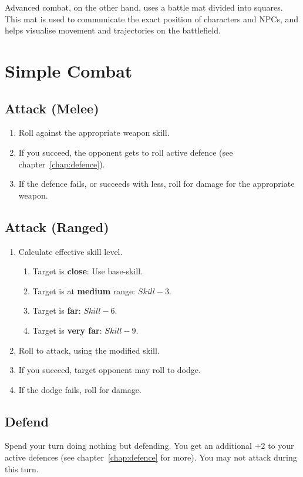 Advanced combat, on the other hand, uses a battle mat divided into squares. This mat is used to communicate the exact position of characters and NPCs, and helps visualise movement and trajectories on the battlefield.

\newpage
\section{Simple Combat}

\subsection{Attack (Melee)}
\begin{enumerate}
    \item Roll against the appropriate weapon skill.
    \item If you succeed, the opponent gets to roll active defence (see chapter~\ref{chap:defence}).
    \item If the defence fails, or succeeds with less, roll for damage for the appropriate weapon.
\end{enumerate}

\subsection{Attack (Ranged)}
\begin{enumerate}
    \item Calculate effective skill level.
        \begin{enumerate}
            \item Target is \textbf{close}: Use base-skill.
            \item Target is at \textbf{medium} range: $Skill-3$.
            \item Target is \textbf{far}: $Skill-6$.
            \item Target is \textbf{very far}: $Skill-9$.
        \end{enumerate}
    \item Roll to attack, using the modified skill.
    \item If you succeed, target opponent may roll to dodge.
    \item If the dodge fails, roll for damage.
\end{enumerate}

\subsection{Defend}
Spend your turn doing nothing but defending. 
You get an additional $+2$ to your active defences (see chapter~\ref{chap:defence} for more). 
You may not attack during this turn.

